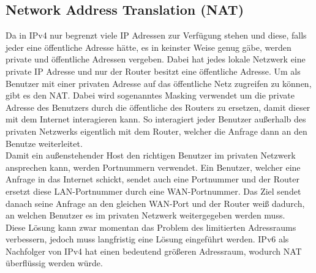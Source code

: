 \documentclass{article}
\begin{document}
	 \subsection{Network Address Translation (NAT)}
	 Da in IPv4 nur begrenzt viele IP Adressen zur Verfügung stehen und diese, falls jeder eine öffentliche Adresse hätte, es in keinster Weise genug gäbe, werden private und öffentliche Adressen vergeben. Dabei hat jedes lokale Netzwerk eine private IP Adresse und nur der Router besitzt eine öffentliche Adresse. Um als Benutzer mit einer privaten Adresse auf das öffentliche Netz zugreifen zu können, gibt es den NAT. Dabei wird sogenanntes Masking verwendet um die private Adresse des Benutzers durch die öffentliche des Routers zu ersetzen, damit dieser mit dem Internet interagieren kann. So interagiert jeder Benutzer außerhalb des privaten Netzwerks eigentlich mit dem Router, welcher die Anfrage dann an den Benutze weiterleitet. \\
	 Damit ein außenstehender Host den richtigen Benutzer im privaten Netzwerk ansprechen kann, werden Portnummern verwendet. Ein Benutzer, welcher eine Anfrage in das Internet schickt, sendet auch eine Portnummer und der Router ersetzt diese LAN-Portnummer durch eine WAN-Portnummer. Das Ziel sendet danach seine Anfrage an den gleichen WAN-Port und der Router weiß dadurch, an welchen Benutzer es im privaten Netzwerk weitergegeben werden muss. \\
	 Diese Lösung kann zwar momentan das Problem des limitierten Adressraums verbessern, jedoch muss langfristig eine Lösung eingeführt werden. IPv6 als Nachfolger von IPv4 hat einen bedeutend größeren Adressraum, wodurch NAT überflüssig werden würde.
\end{document}
